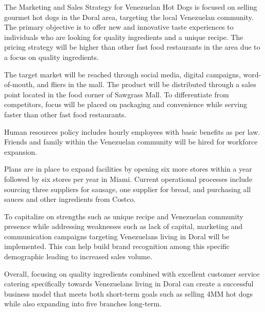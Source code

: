 The Marketing and Sales Strategy for Venezuelan Hot Dogs is focused on selling gourmet hot dogs in the Doral area, targeting the local Venezuelan community. The primary objective is to offer new and innovative taste experiences to individuals who are looking for quality ingredients and a unique recipe. The pricing strategy will be higher than other fast food restaurants in the area due to a focus on quality ingredients.

The target market will be reached through social media, digital campaigns, word-of-mouth, and fliers in the mall. The product will be distributed through a sales point located in the food corner of Sawgrass Mall. To differentiate from competitors, focus will be placed on packaging and convenience while serving faster than other fast food restaurants.

Human resources policy includes hourly employees with basic benefits as per law. Friends and family within the Venezuelan community will be hired for workforce expansion.

Plans are in place to expand facilities by opening six more stores within a year followed by six stores per year in Miami. Current operational processes include sourcing three suppliers for sausage, one supplier for bread, and purchasing all sauces and other ingredients from Costco.

To capitalize on strengths such as unique recipe and Venezuelan community presence while addressing weaknesses such as lack of capital, marketing and communication campaigns targeting Venezuelans living in Doral will be implemented. This can help build brand recognition among this specific demographic leading to increased sales volume.

Overall, focusing on quality ingredients combined with excellent customer service catering specifically towards Venezuelans living in Doral can create a successful business model that meets both short-term goals such as selling 4MM hot dogs while also expanding into five branches long-term.